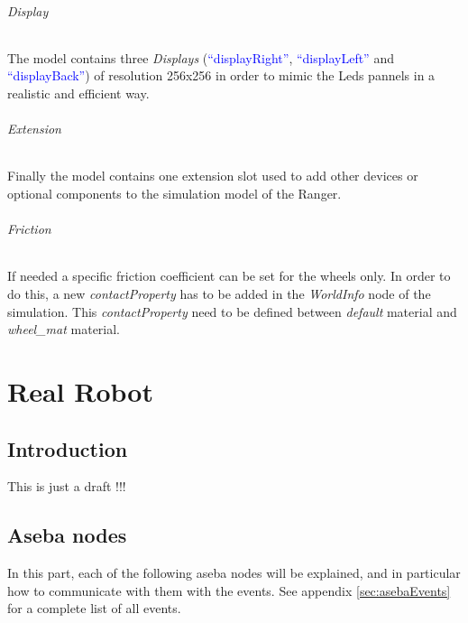 \documentclass[a4paper,11pt]{report}
\begin{document}
\paragraph{Display} The model contains three \textit{Displays} (\textcolor{blue}{“displayRight”}, \textcolor{blue}{“displayLeft”} and \textcolor{blue}{“displayBack”}) of resolution 256x256 in order to mimic the Leds pannels in a realistic and efficient way.

\paragraph{Extension} Finally the model contains one extension slot used to add other devices or optional components to the simulation model of the Ranger.

\paragraph{Friction} If needed a specific friction coefficient can be set for the wheels only. In order to do this, a new \textit{contactProperty} has to be added in the \textit{WorldInfo} node of the simulation. This \textit{contactProperty} need to be defined between \textit{default} material and \textit{wheel\_mat} material.\\















\part{Real Robot}

\chapter{Introduction}
This is just a draft !!!\\

\chapter{Aseba nodes}
In this part, each of the following aseba nodes will be explained, and in particular how to communicate with them with the events. See appendix \ref{sec:asebaEvents} for a complete list of all events.\\
\end{document}
